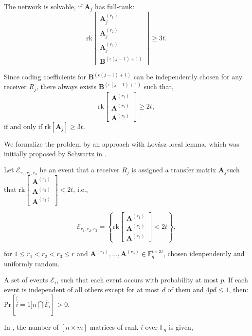 The network is solvable, if $\boldsymbol{A}_{j}$ has full-rank:
\[
\mathrm{rk}\left[\begin{array}{c}
\boldsymbol{A}_{j}^{\left(r_{1}\right)}\\
\boldsymbol{A}_{j}^{\left(r_{2}\right)}\\
\boldsymbol{A}_{j}^{\left(r_{3}\right)}\\
\boldsymbol{B}^{\left(\epsilon\left(j-1\right)+1\right)}
\end{array}\right]\geq3t.
\]

Since coding coefficients for $\boldsymbol{B}^{\left(\epsilon\left(j-1\right)+1\right)}$
can be independently chosen for any receiver $R_{j}$, there always
exists $\boldsymbol{B}^{\left(\epsilon\left(j-1\right)+1\right)}$
such that,
\begin{equation}
\mathrm{rk}\left[\begin{array}{c}
\boldsymbol{A}^{\left(r_{1}\right)}\\
\boldsymbol{A}^{\left(r_{2}\right)}\\
\boldsymbol{A}^{\left(r_{3}\right)}
\end{array}\right]\geq2t,\label{eq:rk_rqm_e1l1h3s4}
\end{equation}
if and only if $\mathrm{rk}\left[\boldsymbol{A}_{j}\right]\geq3t$.

We formalize the problem by an approach with Lov\'asz local lemma,
which was initially proposed by Schwartz in \cite{MosheSchwartz:2018}.

Let $\mathcal{E}_{r_{1},r_{2},r_{3}}$ be an event that a receiver
$R_{j}$ is assigned a transfer matrix $\boldsymbol{A}_{j}$such that
$\mathrm{rk}\left[\begin{array}{c}
\boldsymbol{A}^{\left(r_{1}\right)}\\
\boldsymbol{A}^{\left(r_{2}\right)}\\
\boldsymbol{A}^{\left(r_{3}\right)}
\end{array}\right]<2t$, i.e.,

\[
\mathcal{E}_{r_{1},r_{2},r_{3}}=\left\{ \mathrm{rk}\left[\begin{array}{c}
\boldsymbol{A}^{\left(r_{1}\right)}\\
\boldsymbol{A}^{\left(r_{2}\right)}\\
\boldsymbol{A}^{\left(r_{3}\right)}
\end{array}\right]<2t\right\} ,
\]

for $1\leq r_{1}<r_{2}<r_{3}\leq r$ and $\boldsymbol{A}^{\left(r_{1}\right)},\ldots,\boldsymbol{A}^{\left(r_{3}\right)}\in\ensuremath{\mathbb{F}}_{q}^{t\times3t}$,
chosen idenpendently and uniformly random.
\begin{lem}
 A set of events $\mathcal{E}_{i}$, such that each event occurs
with probability at most $p$. If each event is independent of all
others except for at most $d$ of them and $4pd\leq1$, then: $\mathrm{Pr}\left[\stackrel[i=1]{n}{\bigcap}\overline{\mathcal{E}}_{i}\right]>0$.
\label{thm:LLL}
\end{lem}
In \cite{Overbeck:2007}, the number of $\left[n\times m\right]$
matrices of rank $i$ over $\ensuremath{\mathbb{F}}_{q}$ is given,


